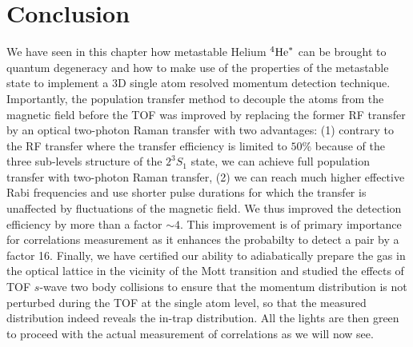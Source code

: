 \section{Conclusion}

We have seen in this chapter how metastable Helium $^4 \mathrm{He}^*$ can be brought to quantum degeneracy and how to make use of the properties of the metastable state to implement a 3D single atom resolved momentum detection technique. Importantly, the population transfer method to decouple the atoms from the magnetic field before the TOF was improved by replacing the former RF transfer by an optical two-photon Raman transfer with two advantages: (1) contrary to the RF transfer where the transfer efficiency is limited to $50 \%$ because of the three sub-levels structure of the $2 ^3 S_1$ state, we can achieve full population transfer with two-photon Raman transfer, (2) we can reach much higher effective Rabi frequencies and use shorter pulse durations for which the transfer is unaffected by fluctuations of the magnetic field. We thus improved the detection efficiency by more than a factor $\sim 4$. This improvement is of primary importance for \kmk correlations measurement as it enhances the probabilty to detect a \kmk pair by a factor 16. Finally, we have certified our ability to adiabatically prepare the gas in the optical lattice in the vicinity of the Mott transition and studied the effects of TOF $s$-wave two body collisions to ensure that the momentum distribution is not perturbed during the TOF at the single atom level, so that the measured distribution indeed reveals the in-trap distribution. All the lights are then green to proceed with the actual measurement of \kmk correlations as we will now see.





